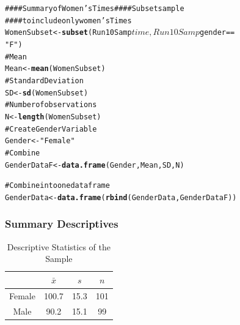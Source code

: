 \documentclass{beamer}\usepackage{graphicx, color}
\makeatletter
\newcommand{\hlfunctioncall}[1]{\textcolor[rgb]{0.501960784313725,0,0.329411764705882}{\textbf{#1}}}%
\newcommand{\hlstring}[1]{\textcolor[rgb]{0.6,0.6,1}{#1}}%
\newcommand{\hlcomment}[1]{\textcolor[rgb]{0.180392156862745,0.6,0.341176470588235}{#1}}%
\newenvironment{kframe}{%
 \def\at@end@of@kframe{}%
 \ifinner\ifhmode%
  \def\at@end@of@kframe{\end{minipage}}%
  \begin{minipage}{\columnwidth}%
 \fi\fi%
 \def\FrameCommand##1{\hskip\@totalleftmargin \hskip-\fboxsep
 \colorbox{shadecolor}{##1}\hskip-\fboxsep
     \hskip-\linewidth \hskip-\@totalleftmargin \hskip\columnwidth}%
 \MakeFramed {\advance\hsize-\width
   \@totalleftmargin\z@ \linewidth\hsize
   \@setminipage}}%
 {\par\unskip\endMakeFramed%
 \at@end@of@kframe}
\newenvironment{knitrout}{}{} %
\makeatother
\begin{document}
\begin{frame}
\begin{knitrout}
\color{fgcolor}\begin{kframe}
\begin{alltt}
\hlcomment{#### Summary of Women's Times #### Subset sample}
\hlcomment{#### to include only women's Times}
WomenSubset <- \hlfunctioncall{subset}(Run10Samp$time, Run10Samp$gender == 
    \hlstring{"F"})
\hlcomment{# Mean}
Mean <- \hlfunctioncall{mean}(WomenSubset)
\hlcomment{# Standard Deviation}
SD <- \hlfunctioncall{sd}(WomenSubset)
\hlcomment{# Number of observations}
N <- \hlfunctioncall{length}(WomenSubset)
\hlcomment{# Create Gender Variable}
Gender <- \hlstring{"Female"}
\hlcomment{# Combine}
GenderDataF <- \hlfunctioncall{data.frame}(Gender, Mean, SD, N)

\hlcomment{# Combine into one data frame}
GenderData <- \hlfunctioncall{data.frame}(\hlfunctioncall{rbind}(GenderData, GenderDataF))
\end{alltt}
\end{kframe}
\end{knitrout}

\end{frame}

\begin{frame}[fragile]
  \frametitle{Summary Descriptives}
  \begin{table}
  \caption{Descriptive Statistics of the Sample}
  \begin{tabular}{c | c c c}
  & $\bar{x}$ & $s$ & $n$ \\
  \hline\hline
  Female & 100.7 & 15.3 & 101 \\
  Male & 90.2 & 15.1 & 99 \\
  \hline
  
  \end{tabular}
  \end{table}
\end{frame}
\end{document}
